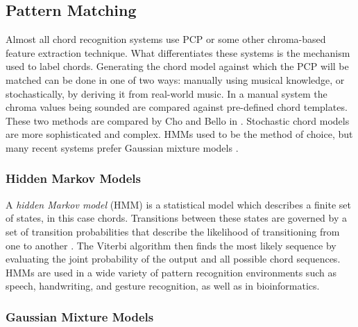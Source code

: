\documentclass{sig-alternate}
\begin{document}
\subsection{Pattern Matching}


Almost all chord recognition systems use PCP or some other chroma-based feature extraction technique. What differentiates these systems is the mechanism used to label chords. Generating the chord model against which the PCP will be matched can be done in one of two ways: manually using musical knowledge, or stochastically, by deriving it from real-world music. In a manual system the chroma values being sounded are compared against pre-defined chord templates. These two methods are compared by Cho and Bello in  \cite{TaeMin:2014}. Stochastic chord models are more sophisticated and complex. HMMs used to be the method of choice, but many recent systems prefer Gaussian mixture models \cite{TaeMin:2014}.


\subsubsection{Hidden Markov Models}\label{main} 

A \textit{hidden Markov model} (HMM) is a statistical model which describes a finite set of states, in this case chords. Transitions between these states are governed by a set of transition probabilities that describe the likelihood of transitioning from one to another \cite{TaeMin:2014}. The Viterbi algorithm then finds the most likely sequence by evaluating the joint probability of the output and all possible chord sequences. HMMs are used in a wide variety of pattern recognition environments such as speech, handwriting, and gesture recognition, as well as in bioinformatics. 


\subsubsection{Gaussian Mixture Models}
\end{document}

